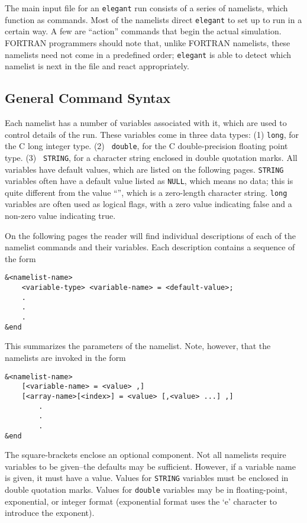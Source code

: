 \documentclass[11pt]{article}
\begin{document}
The main input file for an {\tt elegant} run consists of a series of
namelists, which function as commands.  Most of the namelists direct
{\tt elegant} to set up to run in a certain way.  A few are ``action''
commands that begin the actual simulation.  FORTRAN programmers should
note that, unlike FORTRAN namelists, these namelists need not come in
a predefined order; {\tt elegant} is able to detect which namelist is
next in the file and react appropriately.

\subsection{General Command Syntax}

Each namelist has a number of variables associated with it, which are
used to control details of the run.  These variables come in three
data types: (1) {\tt long}, for the C long integer type.  (2) {\tt
double}, for the C double-precision floating point type. (3) {\tt
STRING}, for a character string enclosed in double quotation marks.
All variables have default values, which are listed on the following
pages.  {\tt STRING} variables often have a default value listed as
{\tt NULL}, which means no data; this is quite different from the
value ``'', which is a zero-length character string.  {\tt long}
variables are often used as logical flags, with a zero value
indicating false and a non-zero value indicating true.

On the following pages the reader will find individual descriptions of each of the namelist commands and their 
variables.  Each description contains a sequence of the form
\begin{verbatim}
&<namelist-name>
    <variable-type> <variable-name> = <default-value>;
    .
    .
    .
&end
\end{verbatim}
This summarizes the parameters of the namelist.  Note, however, that the namelists are invoked in the form
\begin{verbatim}
&<namelist-name>
    [<variable-name> = <value> ,]
    [<array-name>[<index>] = <value> [,<value> ...] ,]
        .
        .
        .
&end
\end{verbatim}  The square-brackets enclose an optional component.  Not all namelists require variables to 
be given--the defaults may be sufficient.  However, if a variable name
is given, it must have a value.  Values for \verb|STRING| variables
must be enclosed in double quotation marks.  Values for \verb|double|
variables may be in floating-point, exponential, or integer format
(exponential format uses the `e' character to introduce the exponent).
\end{document}

